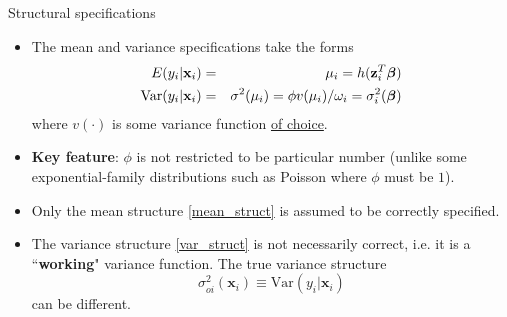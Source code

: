\documentclass{beamer}
\newenvironment{wideitemize}%
  {\begin{itemize}%
    \setlength{\parskip}{1em}}%
  {\end{itemize}}
\begin{document}
\begin{frame} {Structural specifications}
\begin{wideitemize}
\item
The mean and variance specifications take the  forms
\begin{eqnarray}
E(y_i|\textbf{x}_i)&=&\mu_i=h(\textbf{z}_i^T\mbox{\boldmath $\beta$}) \label{mean_struct}\\
\mbox{Var}(y_i|\textbf{x}_i) &=&  \sigma^2(\mu_i)=\phi v(\mu_i)/\omega_i=\sigma^2_i(\mbox{\boldmath $\beta$})  \label{var_struct}
\end{eqnarray}
where $v(\cdot)$ is some variance function \underline{of choice}. 

\item {\bf Key feature}:  $\phi$ is not restricted to be particular number (unlike some exponential-family distributions such as Poisson where $\phi$ must be $1$). 



%


\item  Only the mean structure \eqref{mean_struct} is assumed to be correctly specified. 

\item The variance structure \eqref{var_struct} is not necessarily correct, i.e. it is a ``{\bf working}" variance function. The true  variance  structure
\[
\sigma^2_{oi}(\textbf{x}_i) \equiv \mbox{Var}(y_i|\textbf{x}_i)
\] can be different.

\end{wideitemize}
\end{frame}
\end{document}
